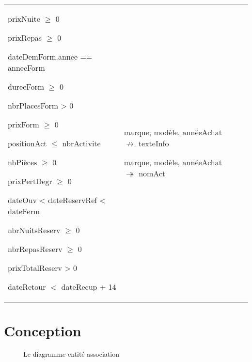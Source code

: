 \documentclass[12pt, a4paper]{article}
\begin{document}
\begin{table}[h]
\begin{tabularx}{\columnwidth}{>{\raggedright}XXXX}
prixNuite $\geq$ 0

prixRepas $\geq$ 0

dateDemForm.annee == anneeForm

dureeForm $\geq$ 0

nbrPlacesForm > 0

prixForm $\geq$ 0

positionAct $\leq$ nbrActivite

nbPièces $\geq$ 0

prixPertDegr $\geq$ 0

dateOuv < dateReservRef < dateFerm

nbrNuitsReserv $\geq$ 0

nbrRepasReserv $\geq$ 0

prixTotalReserv > 0

dateRetour $<$ dateRecup + 14

& marque, modèle, annéeAchat $\not\rightarrow$ texteInfo

marque, modèle, annéeAchat $\twoheadrightarrow$ nomAct

& \\
\end{tabularx}
\end{table}

\section{Conception}
\begin{figure}[h]

\caption{Le diagramme entité-association}
\end{figure}
\end{document}
